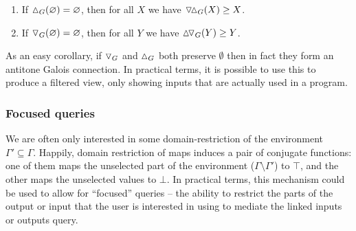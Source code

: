 \begin{lemma}
\item
\begin{enumerate}
   \item If $\demandedByR_G(\emptyset) = \emptyset$, then for all $X$ we have $\relInputR_{G}(X) \geq X$.
   \item If $\triangledown_G(\varnothing) = \varnothing$, then for all $Y$ we have $\relOutputR_{G}(Y) \geq Y$.
\end{enumerate}
\end{lemma}

As an easy corollary, if $\triangledown_G$ and $\demandedByR_G$ both preserve $\emptyset$ then in fact they form
an antitone Galois connection. In practical terms, it is possible to use this to produce a filtered view, only
showing inputs that are actually used in a program. 

\subsubsection{Focused queries}

 We are often only interested in some
domain-restriction of the environment $\Gamma' \subseteq \Gamma$. Happily, domain restriction of maps induces
a pair of conjugate functions: one of them maps the unselected part of the environment ($\Gamma \setminus
\Gamma'$) to $\top$, and the other  maps the unselected values to $\bot$. In practical terms, this mechanism
could be used to allow for ``focused'' queries -- the ability to restrict the parts of the output or input
that the user is interested in using to mediate the linked inputs or outputs query.
